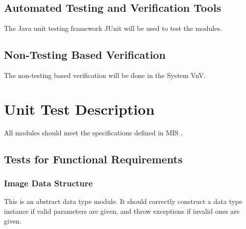 \documentclass[12pt, titlepage]{article}
\begin{document}
\subsection{Automated Testing and Verification Tools}

The Java unit testing framework JUnit will be used to test the modules.

\subsection{Non-Testing Based Verification}

The non-testing based verification will be done in the System VnV.

\section{Unit Test Description}

All modules should meet the specifications defined in MIS \cite{Dong2019MIS}.

\subsection{Tests for Functional Requirements}

\subsubsection{Image Data Structure}
\label{sec_imageData}

This is an abstract data type module. It should correctly construct a data type
instance if valid parameters are given, and throw exceptions if invalid ones are
given.
\end{document}
